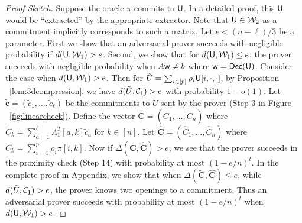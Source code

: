 \begin{proof}[Proof-Sketch]
Suppose the oracle $\pi$ commits to $\mathsf{U}$. In a detailed proof, this $\mathsf{U}$
would be ``extracted'' by the appropriate extractor. Note that $\mathsf{U}\in
\mathcal{W}_2$ as a commitment implicitly corresponds to such a matrix. Let $e<(n-\ell)/3$ be a parameter. First we show that 
an adversarial prover succeeds with negligible probability if $d(\mathsf{U},\mathcal{W}_1)>e$. Second, we
show that for $d(\mathsf{U},\mathcal{W}_1)\leq e$, the prover succeeds with negligible probability when
$A\mathsf{w}\neq b$ where $\mathsf{w}=\mathsf{Dec}(\mathsf{U})$. Consider the case when $d(\mathsf{U},\mathcal{W}_1)>e$. Then for
$\tilde{U}=\sum_{i\in [p]}\rho_i\mathsf{U}[i,\cdot,\cdot]$, by Proposition ~\ref{lem:3dcompression},
 we have $d(\tilde{U},\mathcal{C}_1)>e$ with probability $1-o(1)$. Let $\tilde{\bm{c}}=(\tilde{c}_1,
\ldots,\tilde{c}_\ell)$ be the commitments to $\tilde{U}$ sent by the prover
(Step 3 in Figure ~\ref{fig:linearcheck}). Define 
the vector $\tilde{\bm{C}}=(\tilde{C}_1,\ldots,\tilde{C}_n)$ where
$\tilde{C}_k=\sum_{a=1}^\ell \Lambda_1^T[a,k]\tilde{c}_a$ for $k\in [n]$.
 Let $\hat{\bm{C}}=(\hat{C}_1,\ldots,\hat{C}_n)$ where
$\hat{C}_k=\sum_{i=1}^p\rho_i\pi[i,k]$. Now if
$\Delta(\tilde{\bm{C}},\hat{\bm{C}})>e$, we see that the prover succeeds in the
proximity check (Step 14) with probability at most $(1-e/n)^t$. In the complete proof in
Appendix, we show that when $\Delta(\tilde{\bm{C}},\hat{\bm{C}})\leq e$, 
while $d(\tilde{U},\mathcal{C}_1)>e$, the prover knows two openings to a commitment.
Thus an adversarial prover succeeds with probability at most $(1-e/n)^t$ when
$d(\mathsf{U},\mathcal{W}_1)>e$.


\end{proof}
